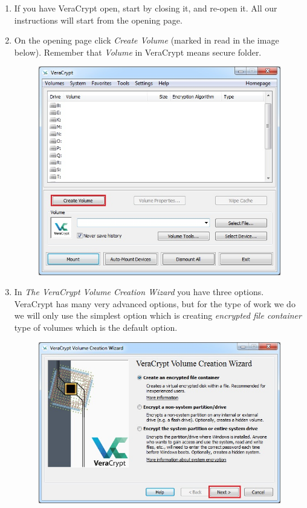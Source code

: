 \documentclass{tufte-handout}
\begin{document}
\begin{enumerate}

	\item If you have VeraCrypt open, start by closing it, and re-open it. All our instructions will start from the opening page.
	\item On the opening page click \textit{Create Volume} (marked in read in the image below). Remember that \textit{Volume} in VeraCrypt means secure folder.
	\begin{figure}%
		\includegraphics[width=.9\linewidth]{img/vc_install_1.png}
	\end{figure}
	\FloatBarrier
		
	\item In \textit{The VeraCrypt Volume Creation Wizard} you have three options. VeraCrypt has many very advanced options, but for the type of work we do we will only use the simplest option which is creating \textit{encrypted file container} type of volumes which is the default option.
	
	\begin{figure}
		\includegraphics[width=.9\linewidth]{img/vc_install_2.png}
	\end{figure}
	\FloatBarrier
	

\end{enumerate}
\end{document}

